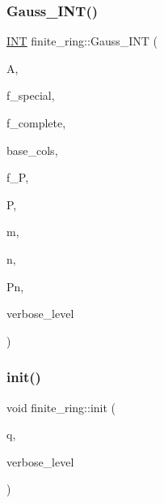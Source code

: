 \subsubsection{\texorpdfstring{Gauss\+\_\+\+I\+N\+T()}{Gauss\_INT()}}
{\footnotesize\ttfamily \mbox{\hyperlink{galois_8h_a09fddde158a3a20bd2dcadb609de11dc}{I\+NT}} finite\+\_\+ring\+::\+Gauss\+\_\+\+I\+NT (\begin{DoxyParamCaption}\item[{\mbox{\hyperlink{galois_8h_a09fddde158a3a20bd2dcadb609de11dc}{I\+NT}} $\ast$}]{A,  }\item[{\mbox{\hyperlink{galois_8h_a09fddde158a3a20bd2dcadb609de11dc}{I\+NT}}}]{f\+\_\+special,  }\item[{\mbox{\hyperlink{galois_8h_a09fddde158a3a20bd2dcadb609de11dc}{I\+NT}}}]{f\+\_\+complete,  }\item[{\mbox{\hyperlink{galois_8h_a09fddde158a3a20bd2dcadb609de11dc}{I\+NT}} $\ast$}]{base\+\_\+cols,  }\item[{\mbox{\hyperlink{galois_8h_a09fddde158a3a20bd2dcadb609de11dc}{I\+NT}}}]{f\+\_\+P,  }\item[{\mbox{\hyperlink{galois_8h_a09fddde158a3a20bd2dcadb609de11dc}{I\+NT}} $\ast$}]{P,  }\item[{\mbox{\hyperlink{galois_8h_a09fddde158a3a20bd2dcadb609de11dc}{I\+NT}}}]{m,  }\item[{\mbox{\hyperlink{galois_8h_a09fddde158a3a20bd2dcadb609de11dc}{I\+NT}}}]{n,  }\item[{\mbox{\hyperlink{galois_8h_a09fddde158a3a20bd2dcadb609de11dc}{I\+NT}}}]{Pn,  }\item[{\mbox{\hyperlink{galois_8h_a09fddde158a3a20bd2dcadb609de11dc}{I\+NT}}}]{verbose\+\_\+level }\end{DoxyParamCaption})}

\mbox{\label{classfinite__ring_a138196727f10c7b36444533e027f5e38}} 
\subsubsection{\texorpdfstring{init()}{init()}}
{\footnotesize\ttfamily void finite\+\_\+ring\+::init (\begin{DoxyParamCaption}\item[{\mbox{\hyperlink{galois_8h_a09fddde158a3a20bd2dcadb609de11dc}{I\+NT}}}]{q,  }\item[{\mbox{\hyperlink{galois_8h_a09fddde158a3a20bd2dcadb609de11dc}{I\+NT}}}]{verbose\+\_\+level }\end{DoxyParamCaption})}

